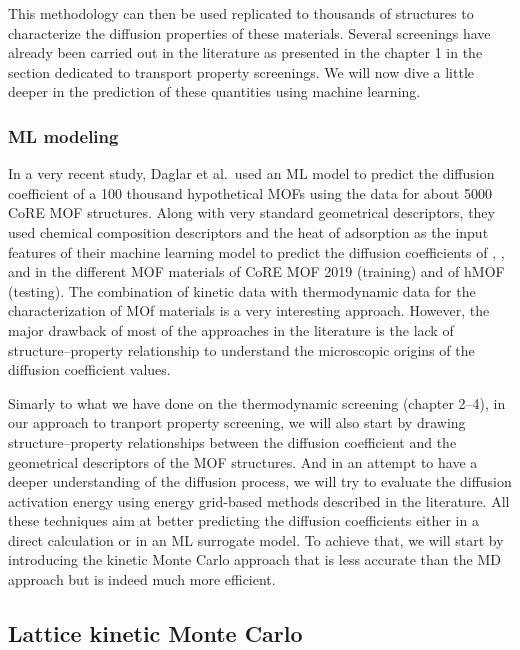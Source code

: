 \documentclass[main]{subfiles}
\begin{document}
This methodology can then be used replicated to thousands of structures to characterize the diffusion properties of these materials. Several screenings have already been carried out in the literature as presented in the chapter 1 in the section dedicated to transport property screenings. We will now dive a little deeper in the prediction of these quantities using machine learning.

\subsubsection{ML modeling}

In a very recent study, Daglar et al.\ used an ML model to predict the diffusion coefficient of a 100 thousand hypothetical MOFs using the data for about 5000 CoRE MOF structures.\autocite{Daglar_2022} Along with very standard geometrical descriptors, they used chemical composition descriptors and the heat of adsorption as the input features of their machine learning model to predict the diffusion coefficients of , ,  and  in the different MOF materials of CoRE MOF 2019 (training) and of hMOF (testing). The combination of kinetic data with thermodynamic data for the characterization of MOf materials is a very interesting approach. However, the major drawback of most of the approaches in the literature is the lack of structure--property relationship to understand the microscopic origins of the diffusion coefficient values.

Simarly to what we have done on the thermodynamic screening (chapter 2--4), in our approach to tranport property screening, we will also start by drawing structure--property relationships between the diffusion coefficient and the geometrical descriptors of the MOF structures. And in an attempt to have a deeper understanding of the diffusion process, we will try to evaluate the diffusion activation energy using energy grid-based methods described in the literature. All these techniques aim at better predicting the diffusion coefficients either in a direct calculation or in an ML surrogate model. To achieve that, we will start by introducing the kinetic Monte Carlo approach that is less accurate than the MD approach but is indeed much more efficient.

\subsection{Lattice kinetic Monte Carlo}
\end{document}

